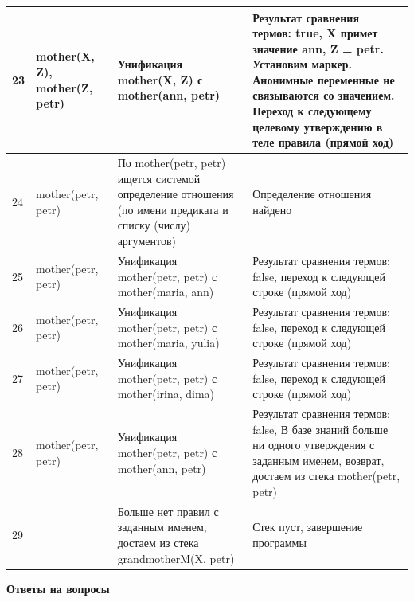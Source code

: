 \documentclass[a4paper,14pt]{extreport} %
\begin{document}
\begin{longtable}{|p{0.5cm}|p{4cm}|p{7cm}|p{5.5cm}|}
	23 &mother(X, Z), mother(Z, petr)& Унификация mother(X, Z) с mother(ann, petr) & Результат сравнения термов: true, X примет значение ann, Z = petr. Установим маркер. Анонимные переменные не связываются со значением. Переход к следующему целевому утверждению в теле правила (прямой ход) \\ \hline
	24 & mother(petr, petr) & По mother(petr, petr)  ищется системой определение отношения (по имени предиката и списку (числу) аргументов) & Определение отношения найдено \\ \hline
	25 &mother(petr, petr) & Унификация mother(petr, petr) с mother(maria, ann) & Результат сравнения термов: false, переход к следующей строке (прямой ход) \\ \hline
	26 &mother(petr, petr) & Унификация mother(petr, petr) с mother(maria, yulia) & Результат сравнения термов: false, переход к следующей строке (прямой ход) \\ \hline
	27 &mother(petr, petr) & Унификация mother(petr, petr) с mother(irina, dima) & Результат сравнения термов: false, переход к следующей строке (прямой ход) \\ \hline
	28 &mother(petr, petr) & Унификация mother(petr, petr) с mother(ann, petr) & Результат сравнения термов: false, В базе знаний больше ни одного утверждения с заданным именем, возврат, достаем из стека mother(petr, petr) \\ \hline
	29 & &  Больше нет правил с заданным именем, достаем из стека grandmotherM(X, petr) & Стек пуст, завершение программы \\ \hline

\end{longtable}

\hfill

\textbf{Ответы на вопросы}
\end{document}
